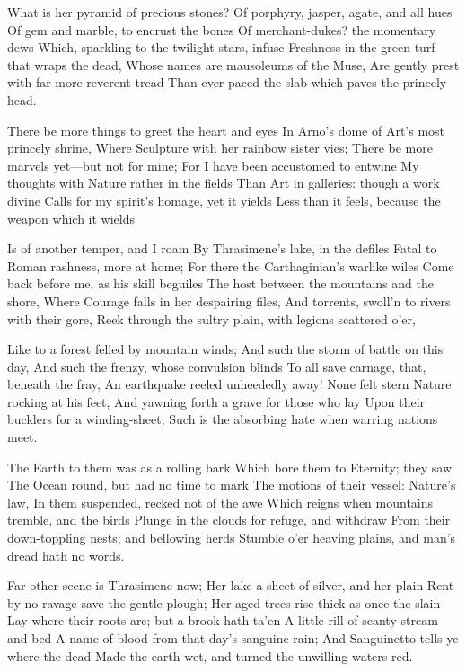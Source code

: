 \documentclass[10pt,twocolumn]{book}
\begin{document}
   What is her pyramid of precious stones?
   Of porphyry, jasper, agate, and all hues
   Of gem and marble, to encrust the bones
   Of merchant-dukes? the momentary dews
   Which, sparkling to the twilight stars, infuse
   Freshness in the green turf that wraps the dead,
   Whose names are mausoleums of the Muse,
   Are gently prest with far more reverent tread
Than ever paced the slab which paves the princely head.


   There be more things to greet the heart and eyes
   In Arno's dome of Art's most princely shrine,
   Where Sculpture with her rainbow sister vies;
   There be more marvels yet---but not for mine;
   For I have been accustomed to entwine
   My thoughts with Nature rather in the fields
   Than Art in galleries:  though a work divine
   Calls for my spirit's homage, yet it yields
Less than it feels, because the weapon which it wields


   Is of another temper, and I roam
   By Thrasimene's lake, in the defiles
   Fatal to Roman rashness, more at home;
   For there the Carthaginian's warlike wiles
   Come back before me, as his skill beguiles
   The host between the mountains and the shore,
   Where Courage falls in her despairing files,
   And torrents, swoll'n to rivers with their gore,
Reek through the sultry plain, with legions scattered o'er,


   Like to a forest felled by mountain winds;
   And such the storm of battle on this day,
   And such the frenzy, whose convulsion blinds
   To all save carnage, that, beneath the fray,
   An earthquake reeled unheededly away!
   None felt stern Nature rocking at his feet,
   And yawning forth a grave for those who lay
   Upon their bucklers for a winding-sheet;
Such is the absorbing hate when warring nations meet.


   The Earth to them was as a rolling bark
   Which bore them to Eternity; they saw
   The Ocean round, but had no time to mark
   The motions of their vessel:  Nature's law,
   In them suspended, recked not of the awe
   Which reigns when mountains tremble, and the birds
   Plunge in the clouds for refuge, and withdraw
   From their down-toppling nests; and bellowing herds
Stumble o'er heaving plains, and man's dread hath no words.


   Far other scene is Thrasimene now;
   Her lake a sheet of silver, and her plain
   Rent by no ravage save the gentle plough;
   Her aged trees rise thick as once the slain
   Lay where their roots are; but a brook hath ta'en\textemdash
   A little rill of scanty stream and bed\textemdash
   A name of blood from that day's sanguine rain;
   And Sanguinetto tells ye where the dead
Made the earth wet, and turned the unwilling waters red.
\end{document}
